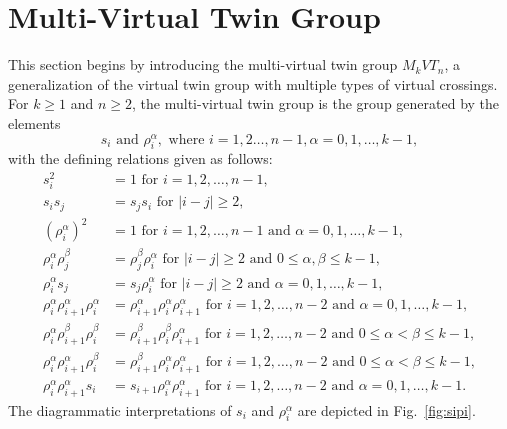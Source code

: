 \documentclass[preprint]{elsarticle}
\begin{document}
\section{Multi-Virtual Twin Group}
 This section begins by introducing  the multi-virtual twin group \(M_kVT_n\), a generalization of the virtual twin group with multiple types of virtual crossings. For $k \geq 1$ and $n \geq 2$, the multi-virtual twin group is the group generated by the elements \[s_i \text{ and }\rho_i^{\alpha},\text{ where } i=1,2 \dots ,n-1, \alpha=0,1,\dots, k-1,\] 
with the defining relations given as follows:
\begin{align}
    s_i^2 &=1 \text{ for } i=1,2,\dots,n-1,\\
    s_is_j &= s_js_i \text{ for } |i-j|\geq 2,\\
    (\rho_i^{\alpha})^2 &= 1 \text{ for } i=1,2, \dots ,n-1 \text{ and } \alpha= 0,1,\dots, k-1 ,\\
    \rho_i^{\alpha} \rho_j^{\beta} &= \rho_j^{\beta} \rho_i^{\alpha} \text{ for } |i-j|\geq 2 \text{ and } 0\leq \alpha, \beta\leq k-1 ,\\
    \rho_i^{\alpha}s_j &= s_j  \rho_i^{\alpha} \text{ for } |i-j|\geq2 \text{ and }  \alpha= 0,1,\dots,k-1,\\
    \rho_i^{\alpha} \rho_{i+1}^{\alpha} \rho_i^{\alpha} &= \rho_{i+1}^{\alpha} \rho_i^{\alpha} \rho_{i+1}^{\alpha} \text{ for } i=1,2,\dots,n-2 \text{ and } \alpha = 0,1,\dots,k-1 ,\\
    \rho_i^{\alpha} \rho_{i+1}^{\beta} \rho_i^{\beta} &= \rho_{i+1}^{\beta} \rho_i^{\beta} \rho_{i+1}^{\alpha} \text{ for } i=1,2,\dots,n-2 \text{ and } 0 \leq \alpha < \beta \leq k-1,   \\
    \rho_i^{\alpha} \rho_{i+1}^{\alpha} \rho_i^{\beta} &= \rho_{i+1}^{\beta} \rho_i^{\alpha} \rho_{i+1}^{\alpha} \text{ for } i=1,2,\dots,n-2 \text{ and } 0 \leq \alpha < \beta \leq k-1, \\
     \rho_i^{\alpha} \rho_{i+1}^{\alpha} s_i &= s_{i+1} \rho_i^{\alpha} \rho_{i+1}^{\alpha} \text{ for } i=1,2,\dots,n-2 \text{ and } \alpha= 0,1,\dots,k-1.
    \end{align}
The diagrammatic interpretations of $s_i$ and $\rho_i^{\alpha}$ are depicted in Fig.~\ref{fig:sipi}. 
\end{document}
